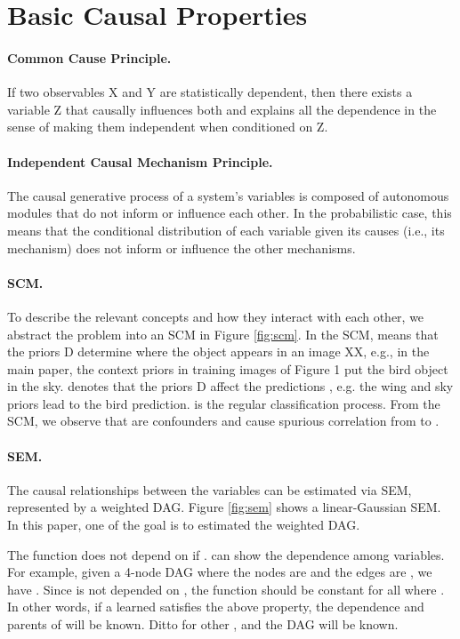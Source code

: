 \documentclass[letterpaper]{article} \usepackage{aaai23}  \usepackage{times}  \usepackage{helvet}  \usepackage{courier}  \usepackage[hyphens]{url}  \usepackage{graphicx} \urlstyle{rm} \def\UrlFont{\rm}  \usepackage{natbib}  \usepackage{caption} \frenchspacing  \setlength{\pdfpagewidth}{8.5in}  \setlength{\pdfpageheight}{11in}  \usepackage{algorithm}
\theoremstyle{plain}
\theoremstyle{definition}
\theoremstyle{remark}
\begin{document}
\section{Basic Causal Properties} \label{app:principle}
\paragraph{Common Cause Principle.} \cite{reichenbach1956direction, scholkopfCausalRepresentationLearning2021} If two observables X and
Y are statistically dependent, then there exists
a variable Z that causally influences both and
explains all the dependence in the sense of making
them independent when conditioned on Z.

\paragraph{Independent Causal Mechanism Principle.} \cite{scholkopfCausalRepresentationLearning2021} The causal generative process of a system’s variables is composed of autonomous modules that do not inform or influence each other. In the probabilistic case, this means that the conditional distribution of each variable given its causes (i.e., its mechanism) does not inform or influence the other mechanisms.

\paragraph{SCM.} 
To describe the relevant concepts and how they interact with each other, we abstract the problem into an SCM in Figure \ref{fig:scm}. In the SCM,  means that the priors D determine where the object appears in an image XX, e.g., in the main paper, the context priors in training images of Figure 1 put the bird object in the sky.  denotes that the priors D affect the predictions , e.g. the wing and sky priors lead to the bird prediction.  is the regular classification process. From the SCM, we observe that  are confounders and cause spurious correlation from  to .

\paragraph{SEM.}  The causal relationships between the variables  can be estimated via SEM, represented by a weighted DAG. Figure \ref{fig:sem} shows a linear-Gaussian SEM. In this paper, one of the goal is to estimated the weighted DAG.

The function  does not depend on  if .  can show the dependence among variables. For example, given a 4-node DAG where the nodes are  and the edges are , we have . Since  is not depended on , the function  should be constant for all  where . In other words, if a learned  satisfies the above property, the dependence and parents of  will be known. Ditto for other , and the DAG will be known. 
\end{document}
